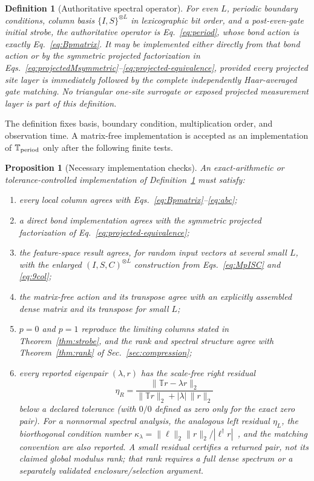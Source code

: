 \documentclass[aps,prx,reprint,superscriptaddress,nobibnotes,longbibliography]{revtex4-2}
\newtheorem{proposition}{Proposition}
\newtheorem{definition}{Definition}
\theoremstyle{remark}
\newcommand{\Tper}{\mathbb T_{\rm period}}
\begin{document}
\begin{definition}[Authoritative spectral operator]
\label{def:operator-contract}
For even $L$, periodic boundary conditions, column basis $\{I,S\}^{\otimes L}$ in lexicographic bit order, and a post-even-gate initial strobe, the authoritative operator is Eq.~\eqref{eq:period}, whose bond action is exactly Eq.~\eqref{eq:Bpmatrix}.  It may be implemented either directly from that bond action or by the symmetric projected factorization in Eqs.~\eqref{eq:projectedMsymmetric}--\eqref{eq:projected-equivalence}, provided every projected site layer is immediately followed by the complete independently Haar-averaged gate matching.  No triangular one-site surrogate or exposed projected measurement layer is part of this definition.
\end{definition}

The definition fixes basis, boundary condition, multiplication order, and observation time.  A matrix-free implementation is accepted as an implementation of $\Tper$ only after the following finite tests.

\begin{proposition}[Necessary implementation checks]
\label{prop:checks}
An exact-arithmetic or tolerance-controlled implementation of Definition~\ref{def:operator-contract} must satisfy:
\begin{enumerate}
\item every local column agrees with Eqs.~\eqref{eq:Bpmatrix}--\eqref{eq:abc};
\item a direct bond implementation agrees with the symmetric projected factorization of Eq.~\eqref{eq:projected-equivalence};
\item the feature-space result agrees, for random input vectors at several small $L$, with the enlarged $(I,S,C)^{\otimes L}$ construction from Eqs.~\eqref{eq:MpISC} and \eqref{eq:9col};
\item the matrix-free action and its transpose agree with an explicitly assembled dense matrix and its transpose for small $L$;
\item $p=0$ and $p=1$ reproduce the limiting columns stated in Theorem~\ref{thm:strobe}, and the rank and spectral structure agree with Theorem~\ref{thm:rank} of Sec.~\ref{sec:compression};
\item every reported eigenpair $(\lambda,r)$ has the scale-free right residual
\begin{equation}
 \eta_R=\frac{\|\mathbb T r-\lambda r\|_2}
 {\|\mathbb T r\|_2+|\lambda|\,\|r\|_2}
 \label{eq:rightresidual}
\end{equation}
below a declared tolerance (with $0/0$ defined as zero only for the exact zero pair).  For a nonnormal spectral analysis, the analogous left residual $\eta_L$, the biorthogonal condition number
$\kappa_\lambda=\|\ell\|_2\|r\|_2/|\ell^\dagger r|$~\cite{StewartSun1990}, and the matching convention are also reported.  A small residual certifies a returned pair, not its claimed global modulus rank; that rank requires a full dense spectrum or a separately validated enclosure/selection argument.
\end{enumerate}
\end{proposition}
\end{document}
